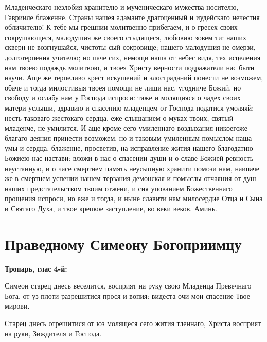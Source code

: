 Младенческаго незлобия хранителю и мученическаго мужества носителю, Гаврииле блаженне. Страны нашея адаманте драгоценный и иудейскаго нечестия обличителю! К тебе мы грешнии молитвенно прибегаем, и о гресех своих сокрушающеся, малодушия же своего стыдящеся, любовию зовем ти: наших скверн не возгнушайся, чистоты сый сокровище; нашего малодушия не омерзи, долготерпения учителю; но паче сих, немощи наша от небес видя, тех исцеления нам твоею подаждь молитвою, и твоея Христу верности подражатели нас быти научи. Аще же терпеливо крест искушений и злостраданий понести не возможем, обаче и тогда милостивыя твоея помощи не лиши нас, угодниче Божий, но свободу и ослабу нам у Господа испроси: таже и молящияся о чадех своих матери услыши, здравию и спасению младенцем от Господа податися умоляяй: несть таковаго жестокаго сердца, еже слышанием о муках твоих, святый младенче, не умилится. И аще кроме сего умиленнаго воздыхания никоегоже благаго деяния принести возможем, но и таковым умиленным помыслом наша умы и сердца, блаженне, просветив, на исправление жития нашего благодатию Божиею нас настави: вложи в нас о спасении души и о славе Божией ревность неустанную, и о часе смертнем память неусыпную хранити помози нам, наипаче же в смертнем успении нашем терзания демонская и помыслы отчаяния от душ наших предстательством твоим отжени, и сия упованием Божественнаго прощения испроси, но еже и тогда, и ныне славити нам милосердие Отца и Сына и Святаго Духа, и твое крепкое заступление, во веки веков. Аминь.

 
\shortpage[2]{}


\section{Праведному Симеону Богоприимцу}
 
\bfseries Тропарь, глас 4-й:\normalfont{}


Симеон старец днесь веселится, восприят на руку свою Младенца Превечнаго Бога, от уз плоти разрешитися прося и вопия: видеста очи мои спасение Твое мирови.




Старец днесь отрешитися от юз молящеся сего жития тленнаго, Христа восприят на руки, Зиждителя и Господа.




